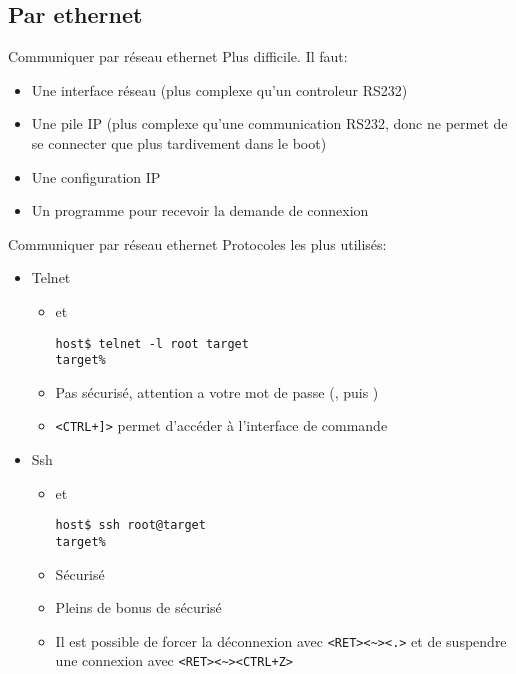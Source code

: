 \subsection{Par ethernet}

\begin{frame}[fragile=singleslide]{Communiquer par réseau ethernet}
  Plus difficile. Il faut:
  \begin{itemize}
  \item Une interface réseau (plus complexe qu'un controleur RS232)
  \item Une pile IP (plus complexe qu'une communication RS232, donc ne
    permet de se connecter que plus tardivement dans le boot)
  \item Une configuration IP
  \item Un programme  pour recevoir la demande de connexion
  \end{itemize}
\end{frame}

\begin{frame}[fragile=singleslide]{Communiquer par réseau ethernet}
  Protocoles les plus utilisés:
  \begin{itemize}
  \item Telnet
    \begin{itemize}
    \item {} et 
      \begin{lstlisting}
host$ telnet -l root target
target%
      \end{lstlisting} %
    \item   Pas   sécurisé,   attention   a   votre   mot   de   passe
      (, puis )
    \item \verb/<CTRL+]>/ permet d'accéder à l'interface de commande
    \end{itemize}
  \item Ssh
    \begin{itemize}
    \item {} et 
\begin{lstlisting}
host$ ssh root@target
target%
\end{lstlisting} %
    \item Sécurisé
    \item Pleins de bonus de sécurisé
    \item   Il   est   possible   de  forcer   la   déconnexion   avec
      \verb/<RET><~><.>/   et   de   suspendre  une   connexion   avec
      \verb/<RET><~><CTRL+Z>/
    \end{itemize}
  \end{itemize}
\end{frame}

